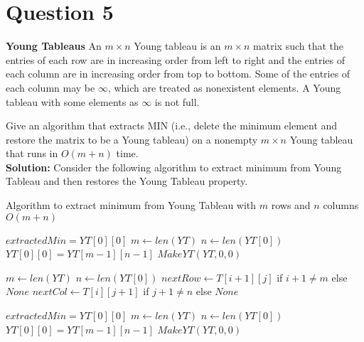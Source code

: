 \documentclass[11pt]{article}
\begin{document}
\section{Question 5} \textbf{Young Tableaus} An $m \times n$ Young tableau is an $m\times n$ matrix such that the entries of each row are in increasing order from left to right and the entries of each column are in increasing order from top to bottom. Some of the entries of each column may be $\infty$, which are treated as nonexistent elements. A Young tableau with some elements as $\infty$ is not full. 

Give an algorithm that extracts MIN (i.e., delete the minimum element and restore the matrix to be a Young tableau) on a nonempty $m\times n$ Young tableau that runs in $O(m+n)$ time. \\

\textbf{Solution:} Consider the following algorithm to extract minimum from Young Tableau and then restores the Young Tableau property. \\

\begin{algorithm}
	\caption{Algorithm to extract minimum from Young Tableau with $ m $ rows and $ n $ columns $ O(m+n) $}
	\begin{algorithmic}[1]
			\State $ extractedMin = YT[0][0] $
			\State $ m \gets len(YT) $ 
			\State $ n \gets len(YT[0]) $ 
			\State $ YT[0][0] = YT[m-1][n-1] $ 
			\State $ MakeYT(YT, 0, 0) $
		\EndProcedure
		
			\State $ m \gets len(YT) $ 
			\State $ n \gets len(YT[0]) $ 
				\State $ nextRow \gets T[i+1][j] $ if $ i+1 \neq m $ else $ None $
				\State $ nextCol \gets T[i][j+1] $ if $ j+1 \neq n $ else $ None $
				
					\State \Return {}
				\EndIf
				
			\EndIf
			\State $ extractedMin = YT[0][0] $
			\State $ m \gets len(YT) $ 
			\State $ n \gets len(YT[0]) $ 
			\State $ YT[0][0] = YT[m-1][n-1] $ 
			\State $ MakeYT(YT, 0, 0) $
		\EndProcedure
	\end{algorithmic}
\end{algorithm}
\end{document}
